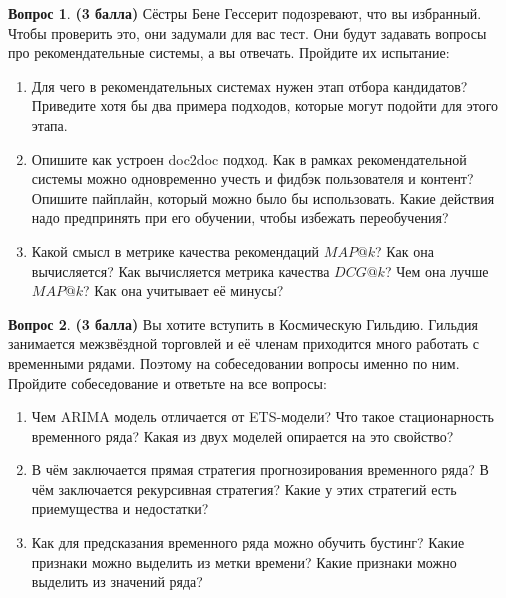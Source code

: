 \documentclass[12pt]{article}
\theoremstyle{definition}
\newtheorem{question}{Вопрос}
\begin{document}
\begin{question} \textbf{(3 балла)} \newline
    Сёстры Бене Гессерит подозревают, что вы избранный. Чтобы проверить это, они задумали для вас тест. Они будут задавать вопросы про рекомендательные системы, а вы отвечать. Пройдите их испытание:
    \begin{enumerate}
        \item  Для чего в рекомендательных системах нужен этап отбора кандидатов? Приведите хотя бы два примера подходов, которые могут подойти для этого этапа. 
        
        \item Опишите как устроен doc2doc подход. Как в рамках рекомендательной системы можно одновременно учесть и фидбэк пользователя и контент? Опишите пайплайн, который можно было бы использовать. Какие действия надо предпринять при его обучении, чтобы избежать переобучения?
        
        \item Какой смысл в метрике качества рекомендаций $MAP@k$? Как она вычисляется? Как вычисляется метрика качества $DCG@k$? Чем она лучше $MAP@k$? Как она учитывает её минусы? 
    \end{enumerate}
\end{question}

\newpage

\begin{question} \textbf{(3 балла)} \newline
    Вы хотите вступить в Космическую Гильдию. Гильдия занимается межзвёздной торговлей и её членам приходится много работать с временными рядами. Поэтому на собеседовании вопросы именно по ним. Пройдите собеседование и ответьте на все вопросы:
    \begin{enumerate}
        \item Чем ARIMA модель отличается от ETS-модели? Что такое стационарность временного ряда? Какая из двух моделей опирается на это свойство? 
        
        \item В чём заключается прямая стратегия прогнозирования временного ряда? В чём заключается рекурсивная стратегия? Какие у этих стратегий есть приемущества и недостатки?

        \item  Как для предсказания временного ряда можно обучить бустинг? Какие признаки можно выделить из метки времени? Какие признаки можно выделить из значений ряда?
    \end{enumerate}
\end{question}
\end{document}
